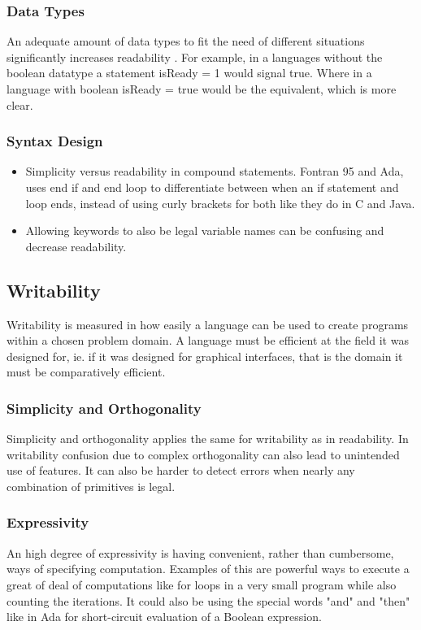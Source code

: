 \subsubsection*{Data Types}
An adequate amount of data types to fit the need of different situations significantly increases readability . For example, in a languages without the boolean datatype a statement 
isReady = 1 would signal true. Where in a language with boolean isReady = true would be the equivalent, which is more clear.

\subsubsection*{Syntax Design}
\begin{itemize}
    \item Simplicity versus readability in compound statements. Fontran 95 and Ada, uses end if and end loop to differentiate between when an if statement and loop ends, instead of using curly brackets for both like they do in C and Java.
    \item Allowing keywords to also be legal variable names can be confusing and decrease readability.
\end{itemize}

\subsection*{Writability}
Writability is measured in how easily a language can be used to create programs within a chosen problem domain. 
A language must be efficient at the field it was designed for, ie. if it was designed for graphical interfaces, that is the domain it must be comparatively efficient.
\subsubsection*{Simplicity and Orthogonality}
Simplicity and orthogonality applies the same for writability as in readability. In writability confusion due to complex orthogonality can also lead to unintended use of features. It can also be harder to detect errors when  nearly any combination of primitives is legal.
\subsubsection*{Expressivity}
An high degree of expressivity is having convenient, rather than cumbersome, ways of specifying computation. Examples of this are powerful ways to execute a great of deal of computations like for loops in a very small program while also counting the iterations. It could also be using the special words "and" and "then" like in Ada for short-circuit evaluation of a Boolean expression.
